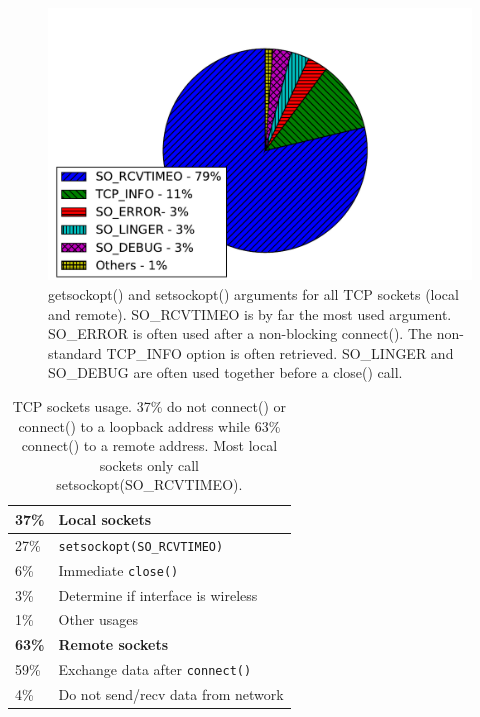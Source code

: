 \begin{figure}
\centering
\includegraphics[width=\columnwidth]{figures/sockopts_pie}
\caption{getsockopt() and setsockopt() arguments for all TCP sockets (local
    and remote). SO\_RCVTIMEO is  by far the most used argument. SO\_ERROR is
    often used after a non-blocking connect(). The non-standard TCP\_INFO
    option is often retrieved. SO\_LINGER and SO\_DEBUG are often used together
    before a close() call.
}
\label{fig:sockopts_usage}
\end{figure}

\begin{table}[]
\centering
\begin{tabular}{ll}
\hline
\textbf{37\%} & \textbf{Local sockets}  \\ \hline
27\%                                & \texttt{setsockopt(SO\_RCVTIMEO)}          \\
6\%                                 & Immediate \texttt{close()}                 \\
3\%                                 & Determine if interface is wireless         \\
1\%                                 & Other usages                               \\ \hline
\textbf{63\%} & \textbf{Remote sockets} \\ \hline
59\%                                & Exchange data after \texttt{connect()}     \\
4\%                                 & Do not send/recv data from network
\end{tabular}
\caption{TCP sockets usage. \textmd{37\% do not connect()
or connect() to a loopback address while 63\% connect() to a remote address.
Most local sockets only call setsockopt(SO\_RCVTIMEO).}}
\label{tab:tcp_sockets_usage}
\end{table}

